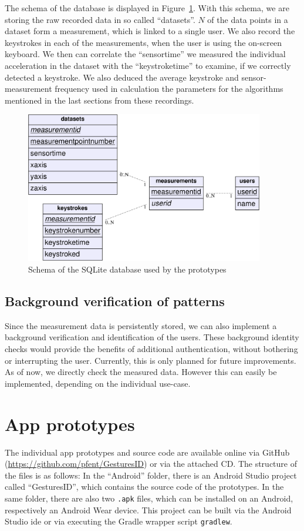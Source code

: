 The schema of the database is displayed in Figure~\ref{fig:dbschema}. With this schema, we are  storing the raw recorded data in so called ``datasets''. $N$ of the data points in a dataset form a measurement, which is linked to a single user. We also record the keystrokes in each of the measurements, when the user is using the on-screen keyboard. We then can correlate the ``sensortime'' we measured the individual acceleration in the dataset with the ``keystroketime'' to examine, if we correctly detected a keystroke. We also deduced the average keystroke and sensor-measurement frequency used in calculation the parameters for the algorithms mentioned in the last sections from these recordings.
\begin{figure}
    \centering
    \includegraphics[width=0.93\textwidth]{figures/databaseschema.png}
    \caption{Schema of the SQLite database used by the prototypes}
    \label{fig:dbschema}
\end{figure}

\subsection{Background verification of patterns}
Since the measurement data is persistently stored, we can also implement a background verification and identification of the users. These background identity checks would provide the benefits of additional authentication, without bothering or interrupting the user.
Currently, this is only planned for future improvements. As of now, we directly check the measured data. However this can easily be implemented, depending on the individual use-case.
\section{App prototypes}
The individual app prototypes and source code are available online via GitHub (\url{https://github.com/pfent/GesturesID}) or via the attached CD. The structure of the files is as follows: In the ``Android'' folder, there is an Android Studio project called ``GesturesID'', which contains the source code of the prototypes. In the same folder, there are also two \lstinline$.apk$ files, which can be installed on an Android, respectively an Android Wear device. This project can be built via the Android Studio \gls{ide} or via executing the Gradle wrapper script \lstinline$gradlew$.

